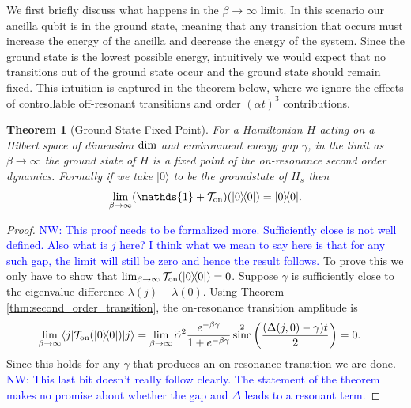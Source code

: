 \documentclass{article}
\newtheorem{theorem}{Theorem}
\newcommand{\on}{\rm on}
\newcommand{\ket}[1]{|#1\rangle}
\newcommand{\bra}[1]{\langle #1|}
\newcommand{\ketbra}[2]{| #1\rangle\! \langle #2|}
\newcommand{\identity}{\mathds{1}}
\DeclareMathOperator{\sinc}{sinc}
\begin{document}
We first briefly discuss what happens in the $\beta \to \infty$ limit. In this scenario our ancilla qubit is in the ground state, meaning that any transition that occurs must increase the energy of the ancilla and decrease the energy of the system. Since the ground state is the lowest possible energy, intuitively we would expect that no transitions out of the ground state occur and the ground state should remain fixed. This intuition is captured in the theorem below, where we ignore the effects of controllable off-resonant transitions and order $(\alpha t)^3$ contributions.
\begin{theorem}[Ground State Fixed Point] \label{thm:ground_state_fixed}
    For a Hamiltonian $H$ acting on a Hilbert space of dimension ${\rm dim}$ and environment energy gap $\gamma$, in the limit as $\beta \to \infty$ the ground state of $H$ is a fixed point of the on-resonance second order dynamics. Formally if we take $\ket{0}$ to be the groundstate of $H_s$ then
    \begin{equation}
        \lim_{\beta \to \infty} (\identity + \mathcal{T}_{\on})(\ketbra{0}{0}) = \ketbra{0}{0}.
    \end{equation}
\end{theorem}
\begin{proof} \textcolor{blue}{NW: This proof needs to be formalized more.  Sufficiently close is not well defined.  Also what is $j$ here?  I think what we mean to say here is that for any such gap, the limit will still be zero and hence the result follows.}
    To prove this we only have to show that $\lim_{\beta \to \infty} \mathcal{T}_{\on}(\ketbra{0}{0}) = 0$. Suppose $\gamma$ is sufficiently close to the eigenvalue difference $\lambda(j) - \lambda(0)$. Using Theorem \ref{thm:second_order_transition}, the on-resonance transition amplitude is
    \begin{align}
        \lim_{\beta \to \infty} \bra{j} \mathcal{T}_{\on}(\ketbra{0}{0}) \ket{j} &= \lim_{\beta \to \infty} \widetilde{\alpha}^2 \frac{e^{-\beta \gamma}}{1 + e^{-\beta \gamma}} \sinc^2 \left( \frac{(\Delta(j,0) - \gamma)t}{2} \right) = 0.
    \end{align}
    Since this holds for any $\gamma$ that produces an on-resonance transition we are done.  \textcolor{blue}{NW: This last bit doesn't really follow clearly.  The statement of the theorem makes no promise about whether the gap and $\Delta$ leads to a resonant term.}
\end{proof}
\end{document}
